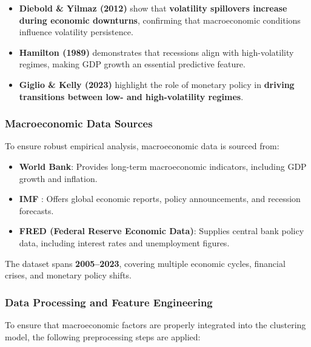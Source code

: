 \begin{itemize}
    \item \textbf{Diebold \& Yilmaz (2012)} \cite{diebold_yilmaz_2012} show that \textbf{volatility spillovers increase during economic downturns}, confirming that macroeconomic conditions influence volatility persistence.
    \item \textbf{Hamilton (1989)} \cite{hamilton_markov_1989} demonstrates that recessions align with high-volatility regimes, making GDP growth an essential predictive feature.
    \item \textbf{Giglio \& Kelly (2023)} \cite{giglio_kelly_2023} highlight the role of monetary policy in \textbf{driving transitions between low- and high-volatility regimes}.

\end{itemize}

\subsubsection{Macroeconomic Data Sources}
To ensure robust empirical analysis, macroeconomic data is sourced from:

\begin{itemize}
    \item \textbf{World Bank}: Provides long-term macroeconomic indicators, including GDP growth and inflation.
    \item \textbf{IMF} \cite{imf_weo_2023}: Offers global economic reports, policy announcements, and recession forecasts.
    \item \textbf{FRED (Federal Reserve Economic Data)}: Supplies central bank policy data, including interest rates and unemployment figures.

\end{itemize}

The dataset spans \textbf{2005–2023}, covering multiple economic cycles, financial crises, and monetary policy shifts.

\subsubsection{Data Processing and Feature Engineering}
To ensure that macroeconomic factors are properly integrated into the clustering model, the following preprocessing steps are applied:

